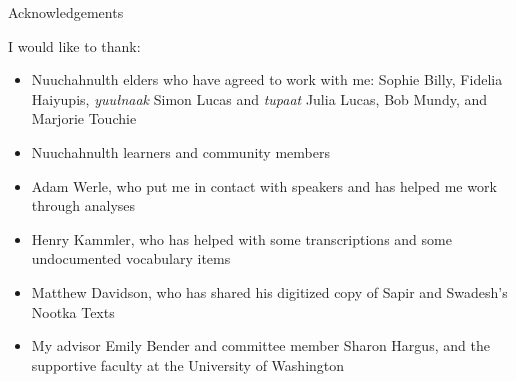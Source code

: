 \begin{frame}{Acknowledgements}

I would like to thank:
\begin{itemize}
	\item Nuuchahnulth elders who have agreed to work with me: Sophie Billy, Fidelia Haiyupis, \textit{yuułnaak} Simon Lucas and \textit{tupaat} Julia Lucas, Bob Mundy, and Marjorie Touchie
	\item Nuuchahnulth learners and community members
	\item Adam Werle, who put me in contact with speakers and has helped me work through analyses
	\item Henry Kammler, who has helped with some transcriptions and some undocumented vocabulary items
	\item Matthew Davidson, who has shared his digitized copy of Sapir and Swadesh's Nootka Texts
	\item My advisor Emily Bender and committee member Sharon Hargus, and the supportive faculty at the University of Washington
\end{itemize}
	
\end{frame}
